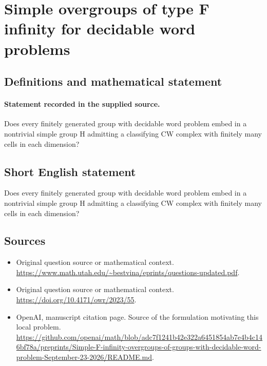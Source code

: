 \documentclass[11pt]{article}
\begin{document}
\section*{Simple overgroups of type F infinity for decidable word problems}\label{30007192}
\subsection{Definitions and mathematical statement}
\paragraph{Statement recorded in the supplied source.}
Does every finitely generated group with decidable word problem embed in a nontrivial simple group H admitting a classifying CW complex with finitely many cells in each dimension?
\subsection{Short English statement}
Does every finitely generated group with decidable word problem embed in a nontrivial simple group H admitting a classifying CW complex with finitely many cells in each dimension?
\subsection{Sources}
\begin{itemize}
\item[S1] Original question source or mathematical context.
\url{https://www.math.utah.edu/~bestvina/eprints/questions-updated.pdf}.
\item[S2] Original question source or mathematical context.
\url{https://doi.org/10.4171/owr/2023/55}.
\item[S3] OpenAI, manuscript citation page. Source of the formulation motivating this local problem.
\url{https://github.com/openai/math/blob/adc7f1241b42e322a6451854ab7e4b4c146bf78a/preprints/Simple-F-infinity-overgroups-of-groups-with-decidable-word-problem-September-23-2026/README.md}.
\end{itemize}
\end{document}
